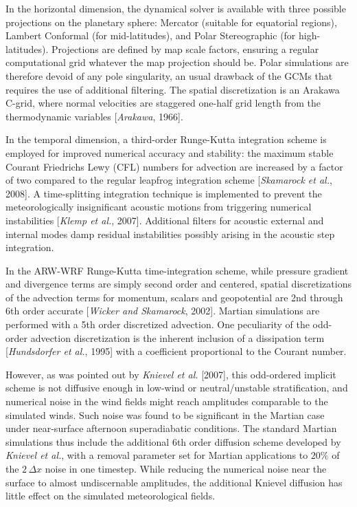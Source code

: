 \sk
In the horizontal dimension, the dynamical solver is available with three possible projections on the planetary sphere: Mercator (suitable for equatorial regions),  Lambert Conformal (for mid-latitudes),  and Polar Stereographic (for high-latitudes). Projections are defined by map scale factors, ensuring a regular computational grid whatever the map projection should be. Polar simulations are therefore devoid of any pole singularity, an usual drawback of the GCMs that requires the use of additional filtering. The spatial discretization is an Arakawa C-grid, where normal velocities are staggered one-half grid length from the thermodynamic variables [\textit{Arakawa}, 1966]\nocite{Arak:66}.

\sk
In the temporal dimension, a third-order Runge-Kutta integration scheme is employed for improved numerical accuracy and stability: the maximum stable Courant Friedrichs Lewy (CFL) numbers for advection are increased by a factor of two compared to the regular leapfrog integration scheme [\textit{Skamarock et al.}, 2008]. A time-splitting integration technique is implemented to prevent the meteorologically insignificant acoustic motions from triggering numerical instabilities [\textit{Klemp et al.}, 2007]\nocite{Klem:07}. Additional filters for acoustic external and internal modes damp residual instabilities possibly arising in the acoustic step integration.

\sk
In the ARW-WRF Runge-Kutta time-integration scheme, while pressure gradient and divergence terms are simply second order and centered, spatial discretizations of the advection terms for momentum, scalars and geopotential are 2nd through 6th order accurate [\textit{Wicker and Skamarock}, 2002]\nocite{Wick:02}. Martian simulations are performed with a 5th order discretized advection. One peculiarity of the odd-order advection discretization is the inherent inclusion of a dissipation term [\textit{Hundsdorfer et al.}, 1995]\nocite{Hund:95} with a coefficient proportional to the Courant number.

\sk
However, as was pointed out by \textit{Knievel et al.} [2007]\nocite{Knie:07}, this odd-ordered implicit scheme is not diffusive enough in low-wind or neutral/unstable stratification, and numerical noise in the wind fields might reach amplitudes comparable to the simulated winds. Such noise was found to be significant in the Martian case under near-surface afternoon superadiabatic conditions. The standard Martian simulations thus include the additional 6th order diffusion scheme developed by \textit{Knievel et al.}, with a removal parameter set for Martian applications to $20\%$ of the $2\,\Delta x$ noise in one timestep. While reducing the numerical noise near the surface to almost undiscernable amplitudes, the additional Knievel diffusion has little effect on the simulated meteorological fields.

